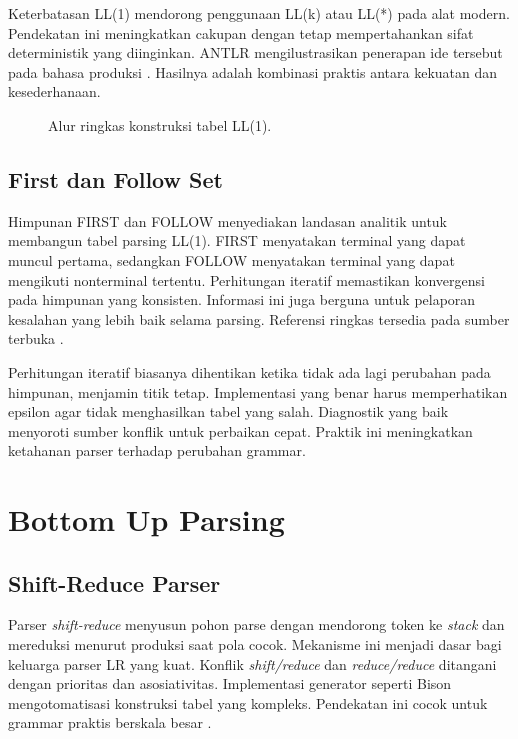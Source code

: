 \documentclass[../main.tex]{subfiles}
\begin{document}
Keterbatasan LL(1) mendorong penggunaan LL(k) atau LL(*) pada alat modern. Pendekatan ini meningkatkan cakupan dengan tetap mempertahankan sifat deterministik yang diinginkan. ANTLR mengilustrasikan penerapan ide tersebut pada bahasa produksi \citep{ANTLRDocs}. Hasilnya adalah kombinasi praktis antara kekuatan dan kesederhanaan.

\begin{figure}[t]
  \centering
  \caption{Alur ringkas konstruksi tabel LL(1).}
  \label{fig:ll1-flow}
\end{figure}

\subsection{First dan Follow Set}
Himpunan FIRST dan FOLLOW menyediakan landasan analitik untuk membangun tabel parsing LL(1). FIRST menyatakan terminal yang dapat muncul pertama, sedangkan FOLLOW menyatakan terminal yang dapat mengikuti nonterminal tertentu. Perhitungan iteratif memastikan konvergensi pada himpunan yang konsisten. Informasi ini juga berguna untuk pelaporan kesalahan yang lebih baik selama parsing. Referensi ringkas tersedia pada sumber terbuka \citep{WikiFirstFollow}.

Perhitungan iteratif biasanya dihentikan ketika tidak ada lagi perubahan pada himpunan, menjamin titik tetap. Implementasi yang benar harus memperhatikan epsilon agar tidak menghasilkan tabel yang salah. Diagnostik yang baik menyoroti sumber konflik untuk perbaikan cepat. Praktik ini meningkatkan ketahanan parser terhadap perubahan grammar.

\section{Bottom Up Parsing}
\subsection{Shift-Reduce Parser}
Parser \emph{shift-reduce} menyusun pohon parse dengan mendorong token ke \emph{stack} dan mereduksi menurut produksi saat pola cocok. Mekanisme ini menjadi dasar bagi keluarga parser LR yang kuat. Konflik \emph{shift/reduce} dan \emph{reduce/reduce} ditangani dengan prioritas dan asosiativitas. Implementasi generator seperti Bison mengotomatisasi konstruksi tabel yang kompleks. Pendekatan ini cocok untuk grammar praktis berskala besar \citep{WikiShiftReduce,BisonManual}.
\end{document}
